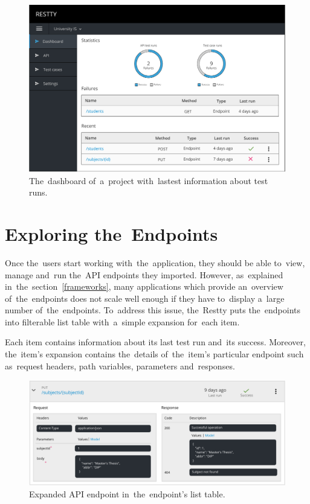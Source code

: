 \begin{figure}[!hbt]
	\centering
	\includegraphics[scale=0.6]{./designs/dashboard.pdf}
	\caption{The~dashboard of~a~project with~lastest information about test runs.}
\end{figure}

\section{Exploring the~Endpoints}
Once the~users start working with~the~application, they should be able to~view,
manage and~run the~API endpoints they imported. However, as~explained
in~the~section~\ref{frameworks}, many applications which provide an~overview
of~the~endpoints does not scale well enough if they have to~display a~large
number of~the~endpoints. To~address this issue, the~Restty puts the~endpoints
into filterable list table with~a~simple expansion for~each item. 

Each item contains information about its last test run and~its success.
Moreover, the~item's expansion contains the~details of~the~item's particular
endpoint such as~request headers, path variables, parameters and~responses.

\begin{figure}[!hbt]
	\centering
	\includegraphics[scale=0.7]{./designs/api-list.pdf}
	\caption{Expanded API endpoint in~the~endpoint's list table.}
\end{figure}

